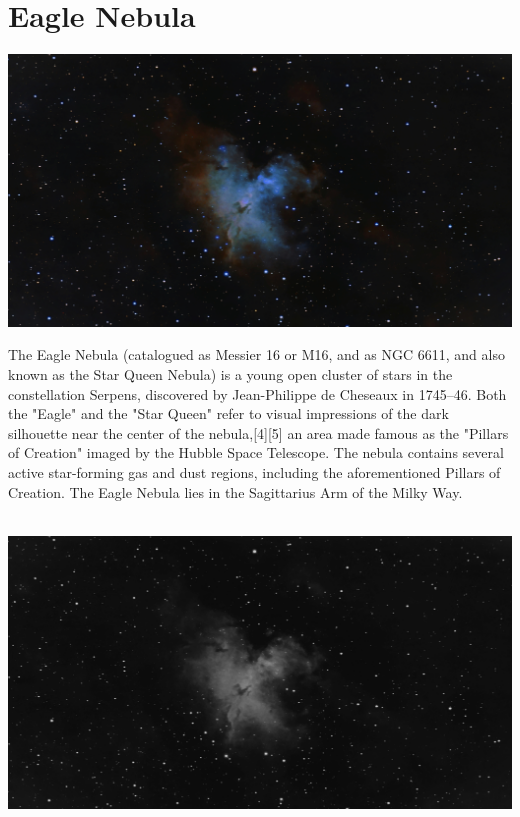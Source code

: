 \ \\\section{Eagle Nebula}
\includegraphics[width=\textwidth]{../Imaging//Original/Eagle_Nebula.jpg}
{\footnotesize\color{white}
The Eagle Nebula (catalogued as Messier 16 or M16, and as NGC 6611, and also known as the Star Queen Nebula) is a young open cluster of stars in the constellation Serpens, discovered by Jean-Philippe de Cheseaux in 1745–46. Both the "Eagle" and the "Star Queen" refer to visual impressions of the dark silhouette near the center of the nebula,[4][5] an area made famous as the "Pillars of Creation" imaged by the Hubble Space Telescope. The nebula contains several active star-forming gas and dust regions, including the aforementioned Pillars of Creation. The Eagle Nebula lies in the Sagittarius Arm of the Milky Way.


}\ \\
\includegraphics[width=\textwidth]{../Imaging//Grayscale/Eagle_Nebula.jpg}
